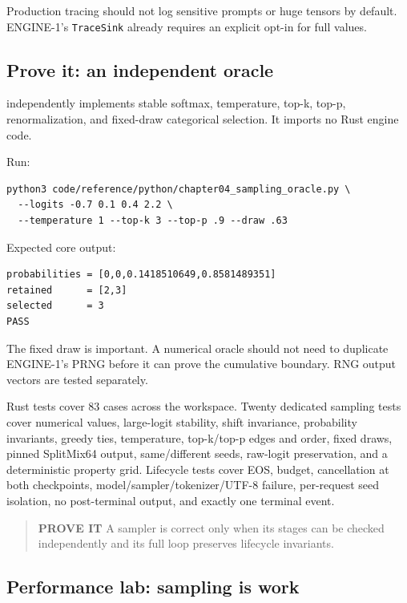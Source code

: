 \documentclass[
  10pt,
]{article}
\begin{document}
Production tracing should not log sensitive prompts or huge tensors by
default. ENGINE-1's \texttt{TraceSink} already requires an explicit
opt-in for full values.

\subsection{Prove it: an independent
oracle}\label{prove-it-an-independent-oracle}

\texttt{}
independently implements stable softmax, temperature, top-k, top-p,
renormalization, and fixed-draw categorical selection. It imports no
Rust engine code.

Run:

\begin{verbatim}
python3 code/reference/python/chapter04_sampling_oracle.py \
  --logits -0.7 0.1 0.4 2.2 \
  --temperature 1 --top-k 3 --top-p .9 --draw .63
\end{verbatim}

Expected core output:

\begin{verbatim}
probabilities = [0,0,0.1418510649,0.8581489351]
retained      = [2,3]
selected      = 3
PASS
\end{verbatim}

The fixed draw is important. A numerical oracle should not need to
duplicate ENGINE-1's PRNG before it can prove the cumulative boundary.
RNG output vectors are tested separately.

Rust tests cover 83 cases across the workspace. Twenty dedicated
sampling tests cover numerical values, large-logit stability, shift
invariance, probability invariants, greedy ties, temperature,
top-k/top-p edges and order, fixed draws, pinned SplitMix64 output,
same/different seeds, raw-logit preservation, and a deterministic
property grid. Lifecycle tests cover EOS, budget, cancellation at both
checkpoints, model/sampler/tokenizer/UTF-8 failure, per-request seed
isolation, no post-terminal output, and exactly one terminal event.

\begin{quote}
\textbf{PROVE IT} A sampler is correct only when its stages can be
checked independently and its full loop preserves lifecycle invariants.
\end{quote}

\subsection{Performance lab: sampling is
work}\label{performance-lab-sampling-is-work}
\end{document}
